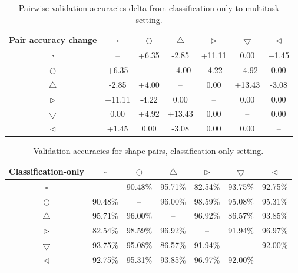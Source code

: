 \documentclass[11pt]{article}
\begin{document}
\begin{table}[H]
  \centering
  \small
  \begin{tabular}{ccccccc}
    \toprule
    \textbf{Pair accuracy change} & $\square$ & $\bigcirc$ & $\bigtriangleup$ & $\rhd$ & $\bigtriangledown$ & $\lhd$ \\
    \midrule
    $\square$ & -- 
      & \cellcolor{gain} +6.35
      & \cellcolor{loss} -2.85
      & \cellcolor{gain} +11.11
      & \cellcolor{same}  0.00
      & \cellcolor{gain} +1.45 \\
    $\bigcirc$ 
      & \cellcolor{gain} +6.35 & -- 
      & \cellcolor{gain} +4.00
      & \cellcolor{loss} -4.22
      & \cellcolor{gain} +4.92
      & \cellcolor{same}  0.00 \\
    $\bigtriangleup$
      & \cellcolor{loss} -2.85
      & \cellcolor{gain} +4.00 & -- 
      & \cellcolor{same}  0.00
      & \cellcolor{gain} +13.43
      & \cellcolor{loss} -3.08 \\
    $\rhd$
      & \cellcolor{gain} +11.11
      & \cellcolor{loss} -4.22
      & \cellcolor{same}  0.00 & -- 
      & \cellcolor{same}  0.00
      & \cellcolor{same}  0.00 \\
    $\bigtriangledown$
      & \cellcolor{same}  0.00
      & \cellcolor{gain} +4.92
      & \cellcolor{gain} +13.43
      & \cellcolor{same}  0.00 & -- 
      & \cellcolor{same}  0.00 \\
    $\lhd$
      & \cellcolor{gain} +1.45
      & \cellcolor{same}  0.00
      & \cellcolor{loss} -3.08
      & \cellcolor{same}  0.00
      & \cellcolor{same}  0.00 & -- \\
    \bottomrule
  \end{tabular}
  \caption{Pairwise validation accuracies delta from classification-only to multitask setting.}
\end{table}

\begin{table}[H]
  \centering
  \small
  \begin{tabular}{ccccccc}
    \toprule
    \textbf{Classification-only} & $\square$ & $\bigcirc$ & $\bigtriangleup$ & $\rhd$ & $\bigtriangledown$ & $\lhd$ \\
    \midrule
    $\square$          & --      & 90.48\% & 95.71\% & 82.54\% & 93.75\% & 92.75\% \\
    $\bigcirc$         & 90.48\% & --      & 96.00\% & 98.59\% & 95.08\% & 95.31\% \\
    $\bigtriangleup$   & 95.71\% & 96.00\% & --      & 96.92\% & 86.57\% & 93.85\% \\
    $\rhd$             & 82.54\% & 98.59\% & 96.92\% & --      & 91.94\% & 96.97\% \\
    $\bigtriangledown$ & 93.75\% & 95.08\% & 86.57\% & 91.94\% & --      & 92.00\% \\
    $\lhd$             & 92.75\% & 95.31\% & 93.85\% & 96.97\% & 92.00\% & --      \\
    \bottomrule
  \end{tabular}
  \caption{Validation accuracies for shape pairs, classification-only setting.}
\end{table}
\end{document}
